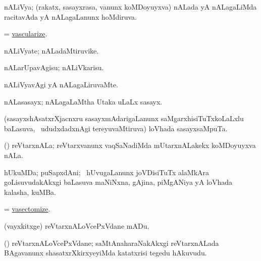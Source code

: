 \bentry
{} 
\gl{\gu}
\expl{}
\bmng
 nALiVya; (rakatx, sasayxrasa, \mo vanunx koMDoyuyxva) nALada yA nALagaLiMda racitavAda yA nALagaLanunx hoMdiruva. 
\emng
\eentry

\bentry
{} 
\gl{\sakirx}
\expl{}
\bmng
 = \hyperlink{vascularize}{vascularize}. 
\emng
\eentry

\bentry
{} 
\gl{\nA}
\expl{}
\bmng
 nALiVyate; nALadaMtiruvike. 
\emng
\eentry

\bentry
{} 
\gl{\sakirx}
\expl{}
\bmng
 nALarUpavAgisu; nALiVkarisu. 
\emng
\eentry

\bentry
{} 
\gl{\kirxvi}
\expl{}
\bmng
 nALiVyavAgi yA nALagaLiruvaMte. 
\emng
\eentry

\bentry
{}
\gl{\nA}
\expl{}
\bmng
 nALasasayx; nALagaLaMtha Utaka uLaLx sasayx. 
\emng
\eentry

\bentry
{} 
\gl{\nA}
\bmng
 (sasayxshAsatxrXjacnxru sasayxmAdarigaLanunx saMgarxhisiTuTxkoLaLxlu baLasuva, \sA\ ududxdadxnAgi tereyuvaMtiruva) loVhada sasayxsaMpuTa. 
\emng
\eentry

\bentry
{} 
\gl{\nA}
\bmng
 (\aMrashA) reVtarxnALa; reVtarxvanunx vaqSaNadiMda mUtarxnALakekx koMDoyuyxva nALa. 
\emng
\eentry

\bentry
{} 
\gl{\nA}
\expl{}
\bmng
 hUkuMDa; puSapxdAni; \kanmu\ hUvugaLanunx joVDisiTuTx alaMkAra goLisuvudakAkxgi baLasuva maNiNxna, gAjina, piMgANiya yA loVhada kalasha, kuMBa. 
\emng
\eentry

\bentry
{} 
\gl{\sakirx}
\expl{}
\bmng
 = \hyperlink{vasectomize}{vasectomize}. 
\emng
\eentry

\bentry
{} 
\gl{\sakirx}
\expl{}
\bmng
 (vayxkitxge) reVtarxnALoVcePxVdane mADu. 
\emng
\eentry

\bentry
{} 
\gl{\nA}
\bmng
 (\shaveY) reVtarxnALoVcePxVdane; saMtAnaharaNakAkxgi reVtarxnALada BAgavanunx shasatxrXkirxyeyiMda katatxrisi tegedu hAkuvudu. 
\emng
\eentry

